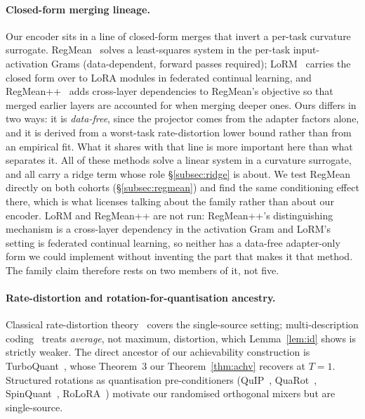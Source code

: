 \paragraph{Closed-form merging lineage.} Our encoder sits in a line of
closed-form merges that invert a per-task curvature surrogate.
RegMean~\citep{jin2023regmean} solves a least-squares system in the
per-task input-activation Grams (data-dependent, forward passes
required); LoRM~\citep{lorm2024} carries the closed form over to LoRA
modules in federated continual learning, and
RegMean++~\citep{regmeanpp2025} adds cross-layer dependencies to
RegMean's objective so that merged earlier layers are accounted for
when merging deeper ones. Ours differs in two ways: it is
\emph{data-free}, since the projector comes from the adapter factors
alone, and it is derived from a worst-task rate-distortion lower bound
rather than from an empirical fit. What it shares with that line is more
important here than what separates it. All of these methods solve a linear
system in a curvature surrogate, and all carry a ridge term whose role
\S\ref{subsec:ridge} is about. We test RegMean directly on both cohorts
(\S\ref{subsec:regmean}) and find the same conditioning effect there, which
is what licenses talking about the family rather than about our encoder.
LoRM and RegMean++ are not run: RegMean++'s distinguishing mechanism is a
cross-layer dependency in the activation Gram and LoRM's setting is
federated continual learning, so neither has a data-free adapter-only form
we could implement without inventing the part that makes it that method.
The family claim therefore rests on two members of it, not five.

\paragraph{Rate-distortion and rotation-for-quantisation ancestry.}
Classical rate-distortion theory~\citep{shannon1959rd,coverthomas}
covers the single-source setting; multi-description
coding~\citep{elgamalcover1982md} treats \emph{average}, not maximum,
distortion, which Lemma~\ref{lem:id} shows is strictly weaker. The
direct ancestor of our achievability construction is
TurboQuant~\citep{zandieh2025turboquant}, whose Theorem~3 our
Theorem~\ref{thm:achv} recovers at $T = 1$. Structured rotations as
quantisation pre-conditioners (QuIP~\citep{tseng2024quip},
QuaRot~\citep{ashkboos2024quarot}, SpinQuant~\citep{liu2025spinquant},
RoLoRA~\citep{xi2024rolora}) motivate our randomised orthogonal mixers
but are single-source.

